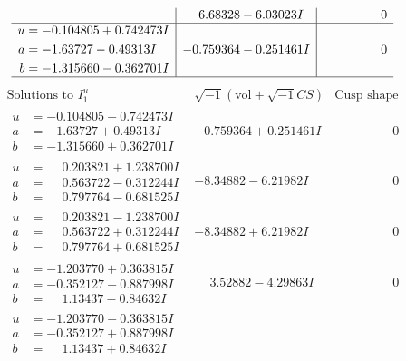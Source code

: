 \documentclass[1p]{elsarticle_modified}
\theoremstyle{definition}
\newcommand{\I}{\sqrt{-1}}
\begin{document}
$$\begin{array}{c|c|c}
 & \phantom{-}6.68328 - 6.03023 I & \phantom{-0.000000 } 0 \\ \hline\begin{aligned}
u &= -0.104805 + 0.742473 I \\
a &= -1.63727 - 0.49313 I \\
b &= -1.315660 - 0.362701 I\end{aligned}
 & -0.759364 - 0.251461 I & \phantom{-0.000000 } 0\\
 \hline 
 \end{array}$$\newpage$$\begin{array}{c|c|c}  
\text{Solutions to }I^u_{1}& \I (\text{vol} + \sqrt{-1}CS) & \text{Cusp shape}\\
 \hline 
\begin{aligned}
u &= -0.104805 - 0.742473 I \\
a &= -1.63727 + 0.49313 I \\
b &= -1.315660 + 0.362701 I\end{aligned}
 & -0.759364 + 0.251461 I & \phantom{-0.000000 } 0 \\ \hline\begin{aligned}
u &= \phantom{-}0.203821 + 1.238700 I \\
a &= \phantom{-}0.563722 - 0.312244 I \\
b &= \phantom{-}0.797764 - 0.681525 I\end{aligned}
 & -8.34882 - 6.21982 I & \phantom{-0.000000 } 0 \\ \hline\begin{aligned}
u &= \phantom{-}0.203821 - 1.238700 I \\
a &= \phantom{-}0.563722 + 0.312244 I \\
b &= \phantom{-}0.797764 + 0.681525 I\end{aligned}
 & -8.34882 + 6.21982 I & \phantom{-0.000000 } 0 \\ \hline\begin{aligned}
u &= -1.203770 + 0.363815 I \\
a &= -0.352127 - 0.887998 I \\
b &= \phantom{-}1.13437 - 0.84632 I\end{aligned}
 & \phantom{-}3.52882 - 4.29863 I & \phantom{-0.000000 } 0 \\ \hline\begin{aligned}
u &= -1.203770 - 0.363815 I \\
a &= -0.352127 + 0.887998 I \\
b &= \phantom{-}1.13437 + 0.84632 I\end{aligned}

\end{array}$$
\end{document}
